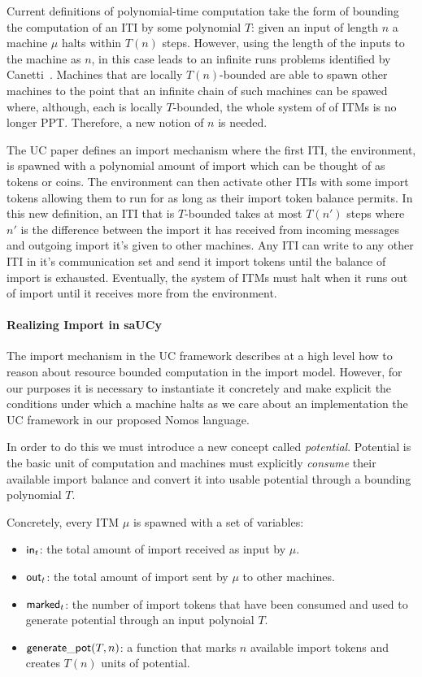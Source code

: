 Current definitions of polynomial-time computation take the form of bounding the computation of an ITI by some polynomial $T$:
given an input of length $n$ a machine $\mu$ halts within $T(n)$ steps.
However, using the length of the inputs to the machine as $n$, in this case leads to an infinite runs problems identified by Canetti~\cite{uc}.
Machines that are locally $T(n)$-bounded are able to spawn other machines to the point that an infinite chain of such machines can be spawed where, although, each is locally $T$-bounded, the whole system of of ITMs is no longer PPT. 
Therefore, a new notion of $n$ is needed. 

The UC paper defines an import mechanism where the first ITI, the environment, is spawned with a polynomial amount of import which can be thought of as tokens or coins.
The environment can then activate other ITIs with some import tokens allowing them to run for as long as their import token balance permits. 
In this new definition, an ITI that is $T$-bounded takes at most $T(n')$ steps where $n'$ is the difference between the import it has received from incoming messages and outgoing import it's given to other machines.
Any ITI can write to any other ITI in it's communication set and send it import tokens until the balance of import is exhausted.
Eventually, the system of ITMs must halt when it runs out of import until it receives more from the environment.

\paragraph{Realizing Import in saUCy}
The import mechanism in the UC framework describes at a high level how to reason about resource bounded computation in the import model.
However, for our purposes it is necessary to instantiate it concretely and make explicit the conditions under which a machine halts as we care about an implementation the UC framework in our proposed Nomos language. 

In order to do this we must introduce a new concept called \textit{potential}. 
Potential is the basic unit of computation and machines must explicitly \textit{consume} their available import balance and convert it into usable potential through a bounding polynomial $T$.

Concretely, every ITM $\mu$ is spawned with a set of variables:
\begin{itemize}
\item ${\mathsf {in}}_t$: the total amount of import received as input by $\mu$.
\item ${\mathsf {out}}_t$: the total amount of import sent by $\mu$ to other machines.
\item ${\mathsf {marked}}_t$: the number of import tokens that have been consumed and used to generate potential through an input polynoial $T$.
\item ${\mathsf {generate\_pot}}(T, n)$: a function that marks $n$ available import tokens and creates $T(n)$ units of potential.
\end{itemize}

